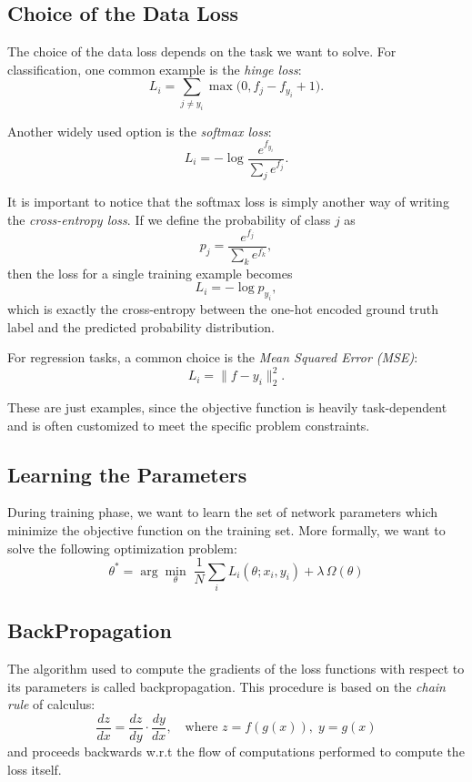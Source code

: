 \subsection{Choice of the Data Loss}

The choice of the data loss depends on the task we want to solve. For classification, one common example is the \textit{hinge loss}:
\[
L_i = \sum_{j \neq y_i} \max \big( 0, f_j - f_{y_i} + 1 \big).
\]

Another widely used option is the \textit{softmax loss}:
\[
L_i = - \log \frac{e^{f_{y_i}}}{\sum_j e^{f_j}}.
\]

It is important to notice that the softmax loss is simply another way of writing the \textit{cross-entropy loss}. If we define the probability of class \(j\) as
\[
p_j = \frac{e^{f_j}}{\sum_k e^{f_k}},
\]
then the loss for a single training example becomes
\[
L_i = - \log p_{y_i},
\]
which is exactly the cross-entropy between the one-hot encoded ground truth label and the predicted probability distribution.

For regression tasks, a common choice is the \textit{Mean Squared Error (MSE)}:
\[
L_i = \| f - y_i \|^2_2.
\]

These are just examples, since the objective function is heavily task-dependent and is often customized to meet the specific problem constraints.

\subsection{Learning the Parameters}
During training phase, we want to learn the set of network parameters which minimize the objective function on the training set. More formally, we want to solve the following optimization problem:
\begin{equation}
  \theta^* = \arg \min_\theta \; \frac{1}{N} \sum_i L_i(\theta; x_i, y_i) + \lambda \, \Omega(\theta)
\end{equation}

\subsection{BackPropagation}
The algorithm used to compute the gradients of the loss functions with respect to its parameters is called backpropagation.
This procedure is based on the \emph{chain rule} of calculus:
\begin{equation}
  \frac{dz}{dx} = \frac{dz}{dy} \cdot \frac{dy}{dx}, \quad \text{where } z = f(g(x)), \; y = g(x)
\end{equation}
and proceeds backwards w.r.t the flow of computations performed to compute the loss itself.

